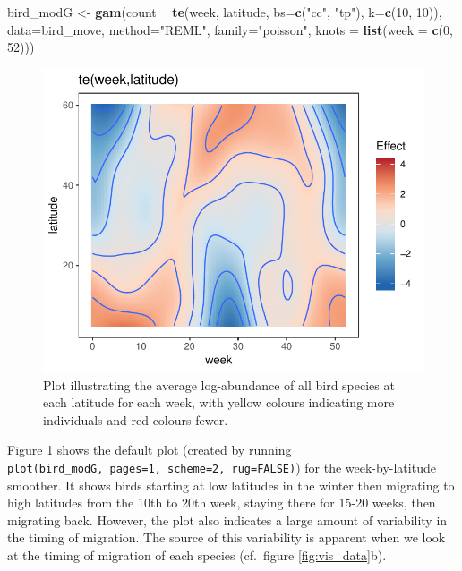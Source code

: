 \documentclass[12pt]{article}
\newenvironment{Shaded}{\begin{snugshade}}{\end{snugshade}}
\newcommand{\KeywordTok}[1]{\textcolor[rgb]{0.13,0.29,0.53}{\textbf{#1}}}
\newcommand{\DataTypeTok}[1]{\textcolor[rgb]{0.13,0.29,0.53}{#1}}
\newcommand{\DecValTok}[1]{\textcolor[rgb]{0.00,0.00,0.81}{#1}}
\newcommand{\StringTok}[1]{\textcolor[rgb]{0.31,0.60,0.02}{#1}}
\newcommand{\OperatorTok}[1]{\textcolor[rgb]{0.81,0.36,0.00}{\textbf{#1}}}
\newcommand{\NormalTok}[1]{#1}
\begin{document}
\begin{Shaded}
\begin{Highlighting}[]
\NormalTok{bird_modG <-}\StringTok{ }\KeywordTok{gam}\NormalTok{(count }\OperatorTok{~}\StringTok{ }\KeywordTok{te}\NormalTok{(week, latitude, }\DataTypeTok{bs=}\KeywordTok{c}\NormalTok{(}\StringTok{"cc"}\NormalTok{, }\StringTok{"tp"}\NormalTok{), }\DataTypeTok{k=}\KeywordTok{c}\NormalTok{(}\DecValTok{10}\NormalTok{, }\DecValTok{10}\NormalTok{)),}
                 \DataTypeTok{data=}\NormalTok{bird_move, }\DataTypeTok{method=}\StringTok{"REML"}\NormalTok{, }\DataTypeTok{family=}\StringTok{"poisson"}\NormalTok{,}
                 \DataTypeTok{knots =} \KeywordTok{list}\NormalTok{(}\DataTypeTok{week =} \KeywordTok{c}\NormalTok{(}\DecValTok{0}\NormalTok{, }\DecValTok{52}\NormalTok{)))}
\end{Highlighting}
\end{Shaded}

\begin{figure}
\centering
\includegraphics{../figures/bird_modG_plot-1.pdf}
\caption{\label{fig:bird_modG} Plot illustrating the average
log-abundance of all bird species at each latitude for each week, with
yellow colours indicating more individuals and red colours fewer.}
\end{figure}

Figure \ref{fig:bird_modG} shows the default plot (created by running
\texttt{plot(bird\_modG,\ pages=1,\ scheme=2,\ rug=FALSE)}) for the
week-by-latitude smoother. It shows birds starting at low latitudes in
the winter then migrating to high latitudes from the 10th to 20th week,
staying there for 15-20 weeks, then migrating back. However, the plot
also indicates a large amount of variability in the timing of migration.
The source of this variability is apparent when we look at the timing of
migration of each species (cf.~figure \ref{fig:vis_data}b).
\end{document}
